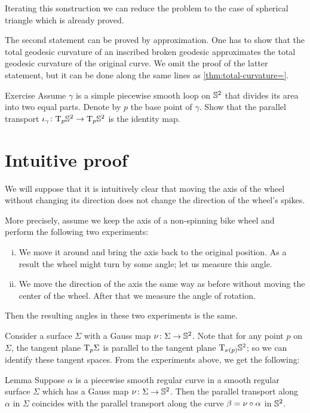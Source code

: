 Iterating this sonstruction we can reduce the problem to the case of spherical triangle which is already proved.


The second statement can be proved by approximation. One has to show that the total geodesic curvature of an inscribed broken geodesic approximates the total geodesic curvature of the original curve.
We omit the proof of the latter statement, but it can be done along the same lines as \ref{thm:total-curvature=}.
\qeds


\begin{thm}{Exercise}\label{ex:half-sphere-total-curvature}
Assume $\gamma$ is a simple piecewise smooth loop on $\mathbb{S}^2$ that divides its area into two equal parts.
Denote by $p$ the base point of $\gamma$.
Show that the parallel transport $\iota_\gamma\colon\mathrm{T}_p\mathbb{S}^2\to\mathrm{T}_p\mathbb{S}^2$ is the identity map.
\end{thm}



\section*{Intuitive proof}

We will suppose that it is intuitively clear that moving the axis of the wheel
without changing its direction 
does not change the direction of the wheel's spikes.

More precisely, assume we keep the axis of a non-spinning bike wheel 
and perform the following two experiments:
\begin{enumerate}[(i)]
\item We move it around and bring the axis back to the original position. 
As a result the wheel might turn by some angle;
let us measure this angle.

\item
We move the direction of the axis the same way as before without moving the center of the wheel.
After that we measure the angle of rotation.
\end{enumerate}
Then the resulting angles in these two experiments is the same. 


Consider a surface $\Sigma$ with a Gauss map $\nu\colon\Sigma\to \mathbb{S}^2$.
Note that for any point $p$ on $\Sigma$, the tangent plane $\mathrm{T}_p\Sigma$ is parallel to the tangent plane $\mathrm{T}_{\nu(p)}\mathbb{S}^2$; so we can identify these tangent spaces.
From the experiments above, we get the following:

\begin{thm}{Lemma}\label{lem:spherical-image}
Suppose $\alpha$ is a piecewise smooth regular curve in a smooth regular surface $\Sigma$ which has a Gauss map $\nu\colon\Sigma\to \mathbb{S}^2$.
Then the parallel transport along $\alpha$ in $\Sigma$ coincides with the parallel transport along the curve $\beta=\nu\circ\alpha$ in $\mathbb{S}^2$.
\end{thm}

